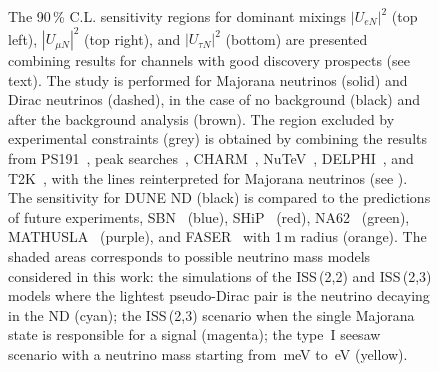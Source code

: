 \begin{figure}
	\centering
	\resizebox{0.49\linewidth}{!}{}
	\resizebox{0.49\linewidth}{!}{}

	\bigskip
	\resizebox{0.49\linewidth}{!}{}
	\caption[Combined sensitivity for dominant mixings for channels with good discovery prospects]%
		{The 90\,\% C.L. sensitivity regions for dominant mixings %
		$|U_{e N}|^2$ (top left), $|U_{\mu N}|^2$ (top right), and $|U_{\tau N}|^2$ (bottom) are presented %
		combining results for channels with good discovery prospects (see text).
		The study is performed for Majorana neutrinos (solid) and Dirac neutrinos (dashed), %
		in the case of no background (black) and after the background analysis (brown).
		The region excluded by experimental constraints (grey) is obtained by combining the results from
		PS191~\cite{Bernardi:1985ny, Bernardi:1987ek}, %
		peak searches~\cite{Artamonov:2014urb, Britton:1992pg, Britton:1992xv, Aguilar-Arevalo:2017vlf, Aguilar-Arevalo:2019owf}, %
		CHARM~\cite{Vilain:1994vg}, NuTeV~\cite{Vaitaitis:1999wq}, DELPHI~\cite{Abreu:1996pa}, and T2K~\cite{Abe:2019kgx}, %
		with the lines reinterpreted for Majorana neutrinos (see ).
		The sensitivity for DUNE ND (black) is compared to the predictions of future experiments, %
		SBN~\cite{Ballett:2016opr} (blue), %
		SHiP~\cite{Alekhin:2015byh} (red), NA62~\cite{Drewes:2018irr} (green), MATHUSLA~\cite{Curtin:2018mvb} (purple), %
		and FASER~\cite{Kling:2018wct} with 1\,m radius (orange).
		The shaded areas corresponds to possible neutrino mass models considered in this work: %
		the simulations of the ISS\,(2,2) and ISS\,(2,3) models where the lightest %
		pseudo-Dirac pair is the neutrino decaying in the ND (cyan); %
		the ISS\,(2,3) scenario when the single Majorana state is responsible for a signal (magenta); %
		the type~I seesaw scenario with a neutrino mass starting from \,meV to \,eV (yellow).}
	\label{fig:sensAll}
\end{figure}

